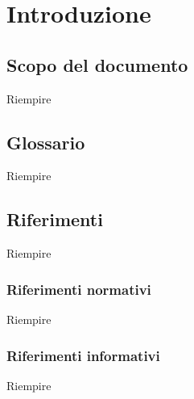 \section{Introduzione} \label{introduzione}
    \subsection{Scopo del documento}
    Riempire

    \subsection{Glossario}
    Riempire

    \subsection{Riferimenti}
    Riempire

        \subsubsection{Riferimenti normativi}
        Riempire

        \subsubsection{Riferimenti informativi}
        Riempire
